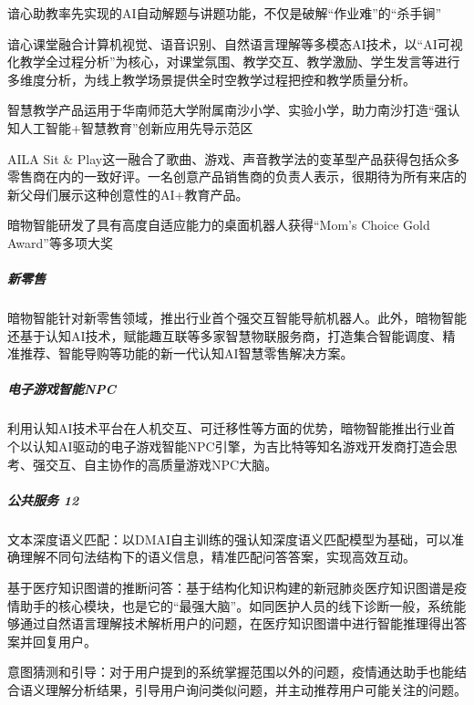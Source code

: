 \documentclass[letterpaper,11pt,english]{sphinxmanual}
\begin{document}
谙心助教率先实现的AI自动解题与讲题功能，不仅是破解“作业难”的“杀手锏”

谙心课堂融合计算机视觉、语音识别、自然语言理解等多模态AI技术，以“AI可视化教学全过程分析”为核心，对课堂氛围、教学交互、教学激励、学生发言等进行多维度分析，为线上教学场景提供全时空教学过程把控和教学质量分析。

智慧教学产品运用于华南师范大学附属南沙小学、实验小学，助力南沙打造“强认知人工智能+智慧教育”创新应用先导示范区

AILA Sit \&
Play这一融合了歌曲、游戏、声音教学法的变革型产品获得包括众多零售商在内的一致好评。一名创意产品销售商的负责人表示，很期待为所有来店的新父母们展示这种创意性的AI+教育产品。

暗物智能研发了具有高度自适应能力的桌面机器人获得“Mom’s Choice Gold
Award”等多项大奖


\subparagraph{新零售}
\label{\detokenize{chapter_dive/dm-ai:id10}}
暗物智能针对新零售领域，推出行业首个强交互智能导航机器人。此外，暗物智能还基于认知AI技术，赋能趣互联等多家智慧物联服务商，打造集合智能调度、精准推荐、智能导购等功能的新一代认知AI智慧零售解决方案。


\subparagraph{电子游戏智能NPC}
\label{\detokenize{chapter_dive/dm-ai:npc}}
利用认知AI技术平台在人机交互、可迁移性等方面的优势，暗物智能推出行业首个以认知AI驱动的电子游戏智能NPC引擎，为吉比特等知名游戏开发商打造会思考、强交互、自主协作的高质量游戏NPC大脑。


\subparagraph{公共服务 12\sphinxfootnotemark[324]}
\label{\detokenize{chapter_dive/dm-ai:id11}}%
\begin{footnotetext}[324]\sphinxAtStartFootnote
{}
%
\end{footnotetext}\ignorespaces 
文本深度语义匹配：以DMAI自主训练的强认知深度语义匹配模型为基础，可以准确理解不同句法结构下的语义信息，精准匹配问答答案，实现高效互动。

基于医疗知识图谱的推断问答：基于结构化知识构建的新冠肺炎医疗知识图谱是疫情助手的核心模块，也是它的“最强大脑”。如同医护人员的线下诊断一般，系统能够通过自然语言理解技术解析用户的问题，在医疗知识图谱中进行智能推理得出答案并回复用户。

意图猜测和引导：对于用户提到的系统掌握范围以外的问题，疫情通达助手也能结合语义理解分析结果，引导用户询问类似问题，并主动推荐用户可能关注的问题。
\end{document}

